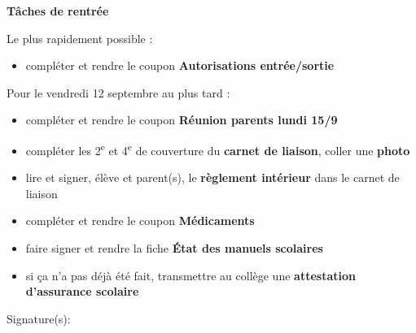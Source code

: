 \documentclass[10pt,a5paper]{article}
\begin{document}
\PfCPanneaux[FeuTricolore]
\begin{tcolorbox}[colback=teal!10!white, colframe=teal!80!black]
\begin{center}
\large\textbf{Tâches de rentrée}
\end{center}
\end{tcolorbox}

\vspace{0.6em}
Le plus rapidement possible :

\begin{itemize}[leftmargin=1.5em, label=$\square$]
    \item compléter et rendre le coupon \textbf{Autorisations entrée/sortie}
\end{itemize}

\vspace{0.6em}
Pour le vendredi 12 septembre au plus tard :
\begin{itemize}[leftmargin=1.5em, label=$\square$]
\item  compléter et rendre le coupon \textbf{Réunion parents lundi 15/9}
\item  compléter les 2\textsuperscript{e} et 4\textsuperscript{e} de couverture du \textbf{carnet de liaison}, coller une \textbf{photo}
\item  lire et signer, élève et parent(s), le \textbf{règlement intérieur} dans le carnet de liaison
\item  compléter et rendre le coupon \textbf{Médicaments}
\item  faire signer et rendre la fiche \textbf{État des manuels scolaires}
\item si ça n’a pas déjà été fait, transmettre au collège une \textbf{attestation d’assurance scolaire}
\end{itemize}
\vspace{1em}
Signature(s):
\end{document}
